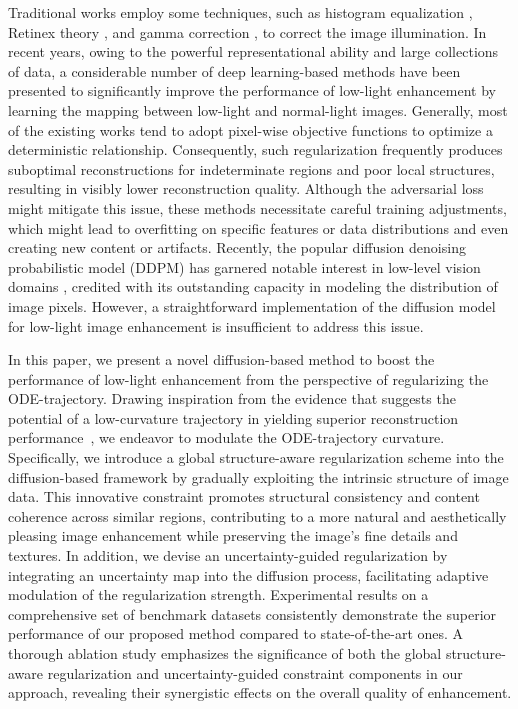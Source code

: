 \documentclass{article}
\begin{document}
Traditional works employ some techniques, such as  histogram equalization \cite{pizer1990contrast}, Retinex theory \cite{guo2016lime,ng2011total}, and gamma correction \cite{rahman2016adaptive}, to correct the image illumination.
In recent years, owing to the powerful representational ability and large collections of data, a considerable number of deep learning-based methods \cite{yang2021band,yang2021sparse,zhao2021deep,guo2020zero,moran2020deeplpf,zheng2021adaptive,wang2022low,xu2022snr,wang2023ultra,zhou2023pyramid} have been presented to significantly improve the performance of low-light enhancement by learning the mapping between low-light and normal-light images. Generally, most of the existing works tend to adopt pixel-wise objective functions to optimize a deterministic relationship. Consequently, such regularization frequently produces suboptimal reconstructions for indeterminate regions and poor local structures, resulting in visibly lower reconstruction quality. Although the adversarial loss might mitigate this issue, these methods necessitate careful training adjustments, which might lead to overfitting on specific features or data distributions and even creating new content or artifacts.
Recently, the popular diffusion denoising probabilistic model (DDPM) \cite{ho2020denoising} has garnered notable interest in low-level vision domains \cite{kawar2022denoising,saharia2022image}, credited with its outstanding capacity in modeling the distribution of image pixels.
However, a straightforward implementation of the diffusion model for low-light image enhancement is insufficient to address this issue.

In this paper, we present a novel diffusion-based method to boost the performance of low-light enhancement from the perspective of regularizing the ODE-trajectory. Drawing inspiration from the evidence that suggests the potential of a low-curvature trajectory in yielding superior reconstruction performance~\cite{lee2023minimizing}, we endeavor to modulate the ODE-trajectory curvature. Specifically, we introduce a global structure-aware regularization scheme into the diffusion-based framework by gradually exploiting the intrinsic structure of image data.
This innovative constraint promotes structural consistency and content coherence across similar regions, contributing to a more natural and aesthetically pleasing image enhancement while preserving the image's fine details and textures.
In addition, we devise an uncertainty-guided regularization by integrating an uncertainty map into the diffusion process, facilitating adaptive modulation of the regularization strength.
Experimental results on a comprehensive set of benchmark datasets consistently demonstrate the superior performance of our proposed method compared to state-of-the-art ones. A thorough ablation study emphasizes the significance of both the global structure-aware regularization and uncertainty-guided constraint components in our approach, revealing their synergistic effects on the overall quality of enhancement.
\end{document}
